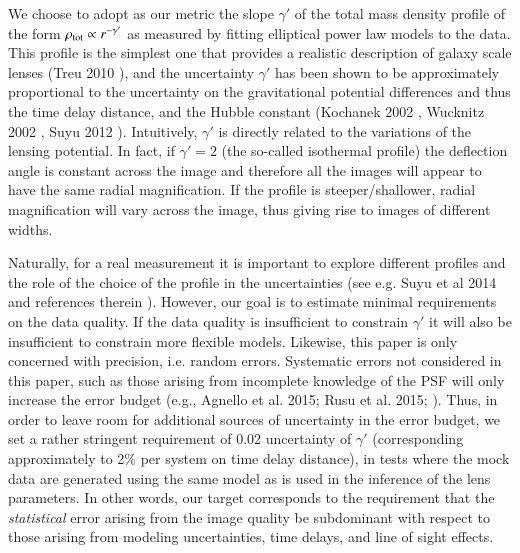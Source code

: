 \documentclass[a4paper,11pt]{article}
\begin{document}
{We choose to adopt as our metric the slope $\gamma'$ of the total mass
density profile of the form $\rho_{\rm tot}\propto r^{-\gamma'}$ as
measured by fitting elliptical power law models to the data. This
profile is the simplest one that provides a realistic description of
galaxy scale lenses (Treu 2010 \citep{2010ARA&A..48...87T}), and the
uncertainty $\gamma'$ has been shown to be approximately proportional
to the uncertainty on the gravitational potential differences and thus
the time delay distance, and the Hubble constant (Kochanek 2002
\citep{2002ApJ...578...25K}, Wucknitz 2002
\citep{2002MNRAS.332..951W}, Suyu 2012
\citep{2012MNRAS.426..868S}).  Intuitively, $\gamma'$ is directly
related to the variations of the lensing potential. In fact, if
$\gamma'=2$ (the so-called isothermal profile) the deflection angle is
constant across the image and therefore all the images will appear to
have the same radial magnification. If the profile is
steeper/shallower, radial magnification will vary across the image,
thus giving rise to images of different widths.

Naturally, for a real measurement it is important to explore different
profiles and the role of the choice of the profile in the
uncertainties (see e.g. Suyu et al 2014 and references therein
\cite{2014ApJ...788L..35S}). However, our goal is to estimate minimal
requirements on the data quality. If the data quality is insufficient
to constrain $\gamma'$ it will also be insufficient to constrain more
flexible models. Likewise, this paper is only concerned with
precision, i.e. random errors. Systematic errors not considered in
this paper, such as those arising from incomplete knowledge of the PSF
will only increase the error budget (e.g., Agnello et al. 2015; Rusu
et al. 2015;
\citep{2015arXiv150602720A,2015arXiv150605147R}).
%
Thus, in order to leave room for additional sources of uncertainty in
the error budget, we set a rather stringent requirement of 0.02
uncertainty of $\gamma'$ (corresponding approximately to 2\% per
system on time delay distance), in tests where the mock data are
generated using the same model as is used in the inference of the lens
parameters. In other words, our target corresponds to the requirement
that the {\it statistical} error arising from the image quality be
subdominant with respect to those arising from modeling uncertainties,
time delays, and line of sight effects.

}
\end{document}
